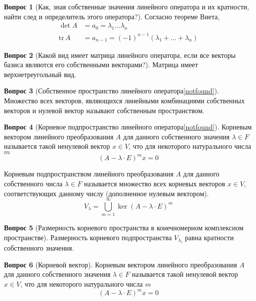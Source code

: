 \documentclass[a4paper,11pt]{article}
\theoremstyle{remark}
\theoremstyle{definition}
\newtheorem{question}{Вопрос}
\begin{document}
\begin{question}[Как, зная собственные значения линейного оператора и их кратности, найти след и определитель этого оператора?]
Согласно теореме Виета, 
\begin{align*}
	\det A &= a_0 = \lambda_1 \dots \lambda_n \\
	\mathrm{tr}\,A &= a_{n-1} = (-1)^{n-1} (\lambda_1 + \dots + \lambda_n)
\end{align*}
\end{question}


\begin{question}[Какой вид имеет матрица линейного оператора, если все векторы базиса являются его собственными векторами?]
Матрица имеет верхнетреугольный вид.
\end{question}


\begin{question}[Собственное пространство линейного оператора\cref{notfound}]
Множество всех векторов, являющихся линейными комбинациями собственных векторов и нулевой вектор называют собственным пространством.
\end{question}


\begin{question}[Корневое подпространство линейного оператора\cref{notfound}]
Корневым вектором линейного преобразования \(A\) для данного собственного значения \(\lambda \in F\) называется такой ненулевой вектор \(x \in V\), что для некоторого натурального числа \(m\)
\begin{equation*}
 	(A - \lambda \cdot E)^mx = 0
\end{equation*} 

Корневым подпространством линейного преобразования \(A\) для данного собственного числа \(\lambda \in F\) называется множество всех корневых векторов \(x \in V\), соответствующих данному числу (дополненное нулевым вектором).
\begin{equation*}
	V_{\lambda} = \bigcup_{m = 1}^{\infty} \ker(A - \lambda \cdot E)^m
\end{equation*}
\end{question}


\begin{question}[Размерность корневого пространства в конечномерном комплексном пространстве]
Размерность корневого подпространства \(V_{\lambda_i}\) равна кратности собственного значения.
\end{question}


\begin{question}[Корневой вектор]
Корневым вектором линейного преобразования \(A\) для данного собственного значения \(\lambda \in F\) называется такой ненулевой вектор \(x \in V\), что для некоторого натурального числа \(m\)
\begin{equation*}
 	(A - \lambda \cdot E)^mx = 0
\end{equation*} 
\end{question}
\end{document}
